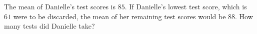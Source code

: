 The mean of Danielle's test scores is $85$. If Danielle's lowest test score, which is $61$ were to be discarded, the mean of her remaining test scores would be $88$. How many tests did Danielle take?
